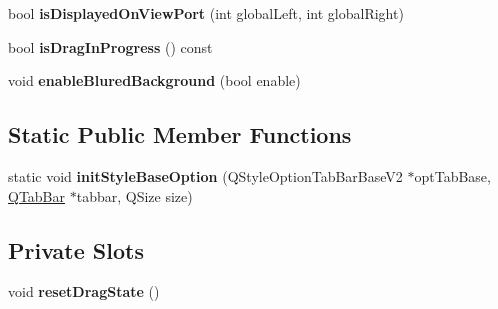 \begin{DoxyCompactItemize}
\item 
\hypertarget{class_tab_bar_helper_a21dac47e89bca9dc01d515763fe9af37}{
bool {\bfseries isDisplayedOnViewPort} (int globalLeft, int globalRight)}
\label{class_tab_bar_helper_a21dac47e89bca9dc01d515763fe9af37}

\item 
\hypertarget{class_tab_bar_helper_ad9fefe50279cc163e20647dd6ef220c6}{
bool {\bfseries isDragInProgress} () const }
\label{class_tab_bar_helper_ad9fefe50279cc163e20647dd6ef220c6}

\item 
\hypertarget{class_tab_bar_helper_ab071cb66c0d3c64e04bb84859bf45bc2}{
void {\bfseries enableBluredBackground} (bool enable)}
\label{class_tab_bar_helper_ab071cb66c0d3c64e04bb84859bf45bc2}

\end{DoxyCompactItemize}
\subsection*{Static Public Member Functions}
\begin{DoxyCompactItemize}
\item 
\hypertarget{class_tab_bar_helper_a83a02154b55440c34316916475c40f6a}{
static void {\bfseries initStyleBaseOption} (QStyleOptionTabBarBaseV2 $\ast$optTabBase, \hyperlink{class_q_tab_bar}{QTabBar} $\ast$tabbar, QSize size)}
\label{class_tab_bar_helper_a83a02154b55440c34316916475c40f6a}

\end{DoxyCompactItemize}
\subsection*{Private Slots}
\begin{DoxyCompactItemize}
\item 
\hypertarget{class_tab_bar_helper_a469ac11124af4ebcc9df692197ed2d8f}{
void {\bfseries resetDragState} ()}
\label{class_tab_bar_helper_a469ac11124af4ebcc9df692197ed2d8f}

\end{DoxyCompactItemize}
